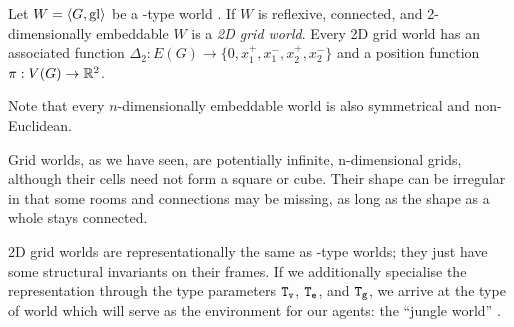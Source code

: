 \begin{definition}
	Let $W = \langle G,\mathrm{gl} \rangle$ be a \wext-type world . If $W$ is reflexive, connected, and 2-dimensionally embeddable $W$ is a {\em 2D grid world}.
	Every 2D grid world has an associated function $\Delta_2 : E(G) \rightarrow \{0,x_1^+,x_1^-,x_2^+,x_2^- \}$ and a position function $\pi : V(G) \rightarrow \mathbb{R}^2$.
\end{definition}
\noindent
Note that every $n$-dimensionally embeddable world is also symmetrical and non-Euclidean.

Grid worlds, as we have seen, are potentially infinite, n-dimensional grids, although their cells need not form a square or cube. Their shape can be irregular in that some rooms and connections may be missing, as long as the shape as a whole stays connected.

2D grid worlds are representationally the same as \wext-type worlds; they just have some structural invariants on their frames. If we additionally specialise the representation through the type parameters $\mathtt{T_v}$, $\mathtt{T_e}$, and $\mathtt{T_g}$, we arrive at the type of world which will serve as the environment for our agents: the ``jungle world'' \wjun.

